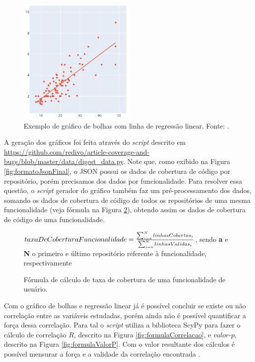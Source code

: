 \documentclass[11.5pt]{article}
\begin{document}
\begin{figure}[ht]
    \centering
    \includegraphics[width=0.5\textwidth]{linear_regression_example.png}
    \caption{Exemplo de gráfico de bolhas com linha de regressão linear. Fonte: \cite{plotly}.}
    \label{fig:lin_reg_example}
\end{figure}

A geração dos gráficos foi feita através do \textit{script} descrito em
\url{https://github.com/redivo/article-coverage-and-bugs/blob/master/data/digest_data.py}.
Note que, como exibido na Figura \ref{fig:formatoJsonFinal}, o JSON possui os dados de cobertura de
código por repositório, porém precisamos dos dados por funcionalidade.
Para resolver essa questão, o \textit{script} gerador do gráfico também faz um pré-processamento
dos dados, somando os dados de cobertura de código de todos os repositórios de uma mesma
funcionalidade (veja fórmula na Figura \ref{fig:formulaTaxaDeCoberturaComponent}), obtendo assim os
dados de cobertura de código de uma funcionalidade.

\begin{figure}[ht]
\label{fig:formulaTaxaDeCoberturaComponent}
\begin{center}
    $taxaDeCoberturaFuncionalidade = {\sum_{i=a}^{N} linhasCobertas_i \over \sum_{i=a}^{N} linhasValidas_i}$, sendo
    \textbf{a} e \textbf{N} o primeiro e último repositório referente à funcionalidade, respectivamente
\end{center}
\caption{Fórmula de cálculo de taxa de cobertura de uma funcionalidade de usuário.}
\end{figure}

Com o gráfico de bolhas e regressão linear já é possível concluir se existe ou não correlação entre
as variáveis estudadas, porém ainda não é possível quantificar a força dessa correlação.
Para tal o \textit{script} utiliza a biblioteca ScyPy
\cite{scipy} para fazer o cálculo de correlação $R$, descrito na Figura \ref{fig:formulaCorrelacao},
e $valor\mbox{-}p$, descrito na Figura \ref{fig:formulaValorP}.
Com o valor resultante dos cálculos é possível mensurar a força e a validade da correlação encontrada
\cite{openIntroStat}.
\end{document}
